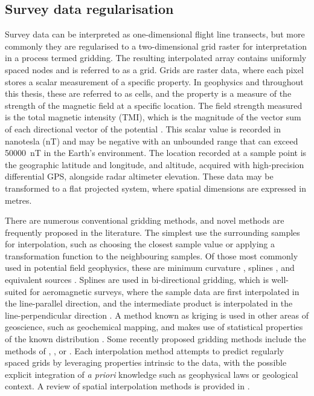 \subsection{Survey data regularisation}
\label{sec:introgrids}
Survey data can be interpreted as one-dimensional flight line transects, but more commonly they are regularised to a two-dimensional grid raster for interpretation in a process termed gridding.
The resulting interpolated array contains uniformly spaced nodes and is referred to as a grid.
Grids are raster data, where each pixel stores a scalar measurement of a specific property.
In geophysics and throughout this thesis, these are referred to as cells, and the property is a measure of the strength of the magnetic field at a specific location.
The field strength measured is the total magnetic intensity (TMI), which is the magnitude of the vector sum of each directional vector of the potential \parencite{blakelyPotentialTheoryGravity1996}.
This scalar value is recorded in nanotesla (nT) and may be negative with an unbounded range that can exceed \qty{50000}{\nano\tesla} in the Earth's environment.
The location recorded at a sample point is the geographic latitude and longitude, and altitude, acquired with high-precision differential GPS, alongside radar altimeter elevation.
These data may be transformed to a flat projected system, where spatial dimensions are expressed in metres.

There are numerous conventional gridding methods, and novel methods are frequently proposed in the literature.
The simplest use the surrounding samples for interpolation, such as choosing the closest sample value or applying a transformation function to the neighbouring samples.
Of those most commonly used in potential field geophysics, these are minimum curvature \parencite{briggsMachineContouringUsing1974}, splines \parencite{bhattacharyyaBicubicSplineInterpolation1969,shureHarmonicSplinesGeomagnetic1982,smithGriddingContinuousCurvature1990}, and equivalent sources \parencite{dampneyEquivalentSourceTechnique1969, solerBetterStrategyInterpolating2020}.
Splines are used in bi-directional gridding, which is well-suited for aeromagnetic surveys, where the sample data are first interpolated in the line-parallel direction, and the intermediate product is interpolated in the line-perpendicular direction \parencite{dentithGeophysicsMineralExploration2014}.
A method known as kriging is used in other areas of geoscience, such as geochemical mapping, and makes use of statistical properties of the known distribution \parencite{hansenInterpretiveGriddingAnisotropic1993,davis1986statistics}.
Some recently proposed gridding methods include the methods of \textcite{naprstekNewMethodInterpolating2019}, \textcite{xuGravityAnomalyReconstruction2019}, or \textcite{chenPotentialFieldData2022}.
Each interpolation method attempts to predict regularly spaced grids by leveraging properties intrinsic to the data, with the possible explicit integration of \emph{a priori} knowledge such as geophysical laws or geological context.
A review of spatial interpolation methods is provided in \textcite{liReviewComparativeStudies2011}.

